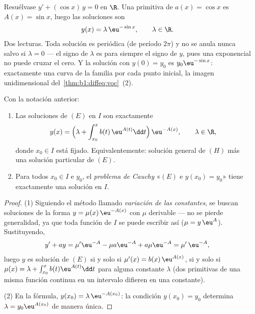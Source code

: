 \begin{example}\label{ex:b1:diffeq:varcoeff}
Resuélvase $y' + (\cos x)\,y = 0$ en $\R$. Una primitiva de
$a(x) = \cos x$ es $A(x) = \sin x$, luego las soluciones son
\[
y(x) = \lambda\,\eu^{-\sin x}, \qquad \lambda \in \R .
\]
Dos lecturas. Toda solución es periódica (de período $2\pi$) y no se
anula nunca salvo si $\lambda = 0$ --- el signo de $\lambda$ es para
siempre el signo de $y$, pues una exponencial no puede cruzar el cero.
Y la solución con $y(0) = y_0$ es $y_0\eu^{-\sin x}$: exactamente una
curva de la familia por cada punto inicial, la imagen unidimensional
del~\cref{thm:b1:diffeq:voc}~(2).
\end{example}

\begin{theorem}\label{thm:b1:diffeq:voc}
Con la notación anterior:
\begin{enumerate}
  \item Las soluciones de $(E)$ en $I$ son exactamente
        \[
        y(x) = \Bigl(\lambda + \int_{x_0}^{x} b(t)\, \eu^{A(t)} \dd t
        \Bigr)\, \eu^{-A(x)},
        \qquad \lambda \in \R,
        \]
        donde $x_0 \in I$ está fijado. Equivalentemente: solución
        general de $(H)$ más una solución particular de $(E)$.
  \item Para todos $x_0 \in I$ e $y_0$, el \emph{problema de
        Cauchy} «$(E)$ e $y(x_0) = y_0$»
        tiene exactamente una solución en $I$.
\end{enumerate}
\end{theorem}

\begin{proof}
(1) Siguiendo el método llamado \emph{variación de las
constantes}, se buscan soluciones de
la forma $y = \mu(x)\, \eu^{-A(x)}$ con $\mu$ derivable --- no se
pierde generalidad, ya que toda función de $I$ se puede escribir así
($\mu = y\,\eu^{A}$). Sustituyendo,
\[
y' + ay = \mu' \eu^{-A} - \mu a \eu^{-A} + a\mu\eu^{-A}
= \mu'\, \eu^{-A},
\]
luego $y$ es solución de $(E)$ si y solo si $\mu'(x) = b(x)\,\eu^{A(x)}$,
si y solo si $\mu(x) = \lambda + \int_{x_0}^x b(t)\eu^{A(t)}\dd t$ para
alguna constante $\lambda$ (dos primitivas de una misma función
continua en un intervalo difieren en una constante).

(2) En la fórmula, $y(x_0) = \lambda\,\eu^{-A(x_0)}$: la condición
$y(x_0) = y_0$ determina $\lambda = y_0 \eu^{A(x_0)}$ de manera única.
\end{proof}

